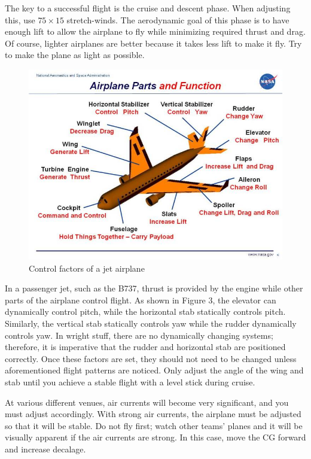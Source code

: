 \documentclass[twocolumn]{article}
\begin{document}
The key to a successful flight is the cruise and descent phase. When adjusting this, use $75\times15$ stretch-winds. The aerodynamic goal of this phase is to have enough lift to allow the airplane to fly while minimizing required thrust and drag. Of course, lighter airplanes are better because it takes less lift to make it fly. Try to make the plane as light as possible. 

\begin{figure}
\caption{Control factors of a jet airplane}
\centering
\includegraphics[scale=0.4]{parts}
\end{figure}

In a passenger jet, such as the B737, thrust is provided by the engine while other parts of the airplane control flight. As shown in Figure 3, the elevator can dynamically control pitch, while the horizontal stab statically controls pitch. Similarly, the vertical stab statically controls yaw while the rudder dynamically controls yaw. In wright stuff, there are no dynamically changing systems; therefore, it is imperative that the rudder and horizontal stab are positioned correctly. Once these factors are set, they should not need to be changed unless aforementioned flight patterns are noticed. Only adjust the angle of the wing and stab until you achieve a stable flight with a level stick during cruise. 

At various different venues, air currents will become very significant, and you must adjust accordingly. With strong air currents, the airplane must be adjusted so that it will be stable. Do not fly first; watch other teams' planes and it will be visually apparent if the air currents are strong. In this case, move the CG forward and increase decalage. 
\end{document}
